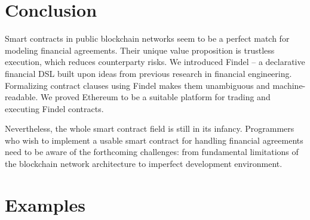 \section{Conclusion}

Smart contracts in public blockchain networks seem to be a perfect match for modeling financial agreements.
Their unique value proposition is trustless execution, which reduces counterparty risks.
We introduced Findel -- a declarative financial DSL built upon ideas from previous research in financial engineering.
Formalizing contract clauses using Findel makes them unambiguous and machine-readable.
We proved Ethereum to be a suitable platform for trading and executing Findel contracts.

Nevertheless, the whole smart contract field is still in its infancy.
Programmers who wish to implement a usable smart contract for handling financial agreements need to be aware of the forthcoming challenges: from fundamental limitations of the blockchain network architecture to imperfect development environment.



\section{Examples} \label{sec:Ch10FindelExamples}

